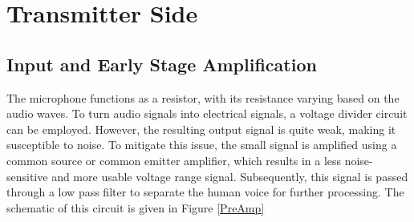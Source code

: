 \documentclass[a4paper,10pt]{IEEEtran}
\begin{document}
\section{Transmitter Side}
\subsection{Input and Early Stage Amplification}
The microphone functions as a resistor, with its resistance varying based on the audio waves. To turn audio signals into electrical signals, a voltage divider circuit can be employed. However, the resulting output signal is quite weak, making it susceptible to noise. To mitigate this issue, the small signal is amplified using a common source or common emitter amplifier, which results in a less noise-sensitive and more usable voltage range signal. Subsequently, this signal is passed through a low pass filter to separate the human voice for further processing. The schematic of this circuit is given in Figure \ref{PreAmp}
\end{document}

